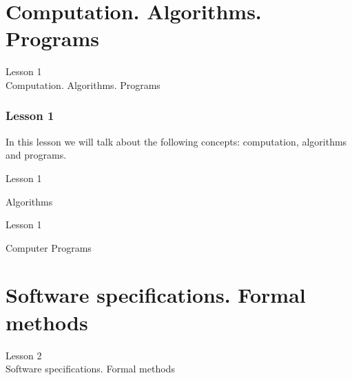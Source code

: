 \documentclass[aspectratio=1610]{beamer}
\begin{document}
\section{Computation. Algorithms. Programs}

\begin{frame}
\begin{center}
\Huge Lesson 1\\
Computation. Algorithms. Programs
\end{center}
\end{frame}


\begin{frame}
\frametitle{Lesson 1}

\Huge In this lesson we will talk about the following concepts:
 \alert{computation},
 \alert{algorithms} and
 \alert{programs}. 

\end{frame}



\begin{frame}{Lesson 1}{}
\begin{center}
\Huge Algorithms
\end{center}
\end{frame}




\begin{frame}{Lesson 1}{}
\begin{center}
\Huge Computer Programs
\end{center}
\end{frame}



\section{Software specifications. Formal methods}


\begin{frame}
\begin{center}
\Huge Lesson 2\\
Software specifications. Formal methods
\end{center}
\end{frame}
\end{document}
